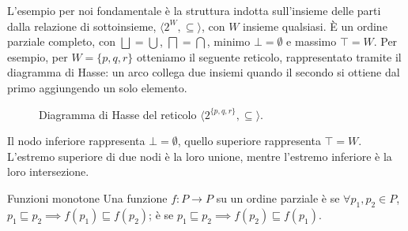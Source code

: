 \begin{example}{}
  L'esempio per noi fondamentale è la struttura indotta sull'insieme delle parti dalla relazione di sottoinsieme, \(\langle 2^W, \subseteq \rangle\), con \(W\) insieme qualsiasi. È un ordine parziale completo, con \(\bigsqcup = \bigcup\), \(\bigsqcap = \bigcap\), minimo \(\bot = \emptyset\) e massimo \(\top = W\).
  Per esempio, per \(W=\{p,q,r\}\) otteniamo il seguente reticolo, rappresentato tramite il diagramma di Hasse: un arco collega due insiemi quando il secondo si ottiene dal primo aggiungendo un solo elemento.

  \begin{figure}[H]
    \centering
    \caption{Diagramma di Hasse del reticolo \(\langle 2^{\{p,q,r\}},\subseteq\rangle\).}
    \label{fig:ctl-power-set-lattice}
  \end{figure}

  Il nodo inferiore rappresenta \(\bot=\emptyset\), quello superiore rappresenta \(\top=W\). L'estremo superiore di due nodi è la loro unione, mentre l'estremo inferiore è la loro intersezione.
\end{example}

\begin{definition}{Funzioni monotone}
  Una funzione \(f: P \to P\) su un ordine parziale è  se \(\forall p_1, p_2 \in P\), \(p_1 \sqsubseteq p_2 \implies f(p_1) \sqsubseteq f(p_2)\); è  se \(p_1 \sqsubseteq p_2 \implies f(p_2) \sqsubseteq f(p_1)\).
\end{definition}

